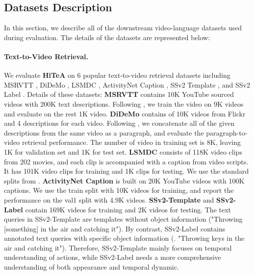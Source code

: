 \documentclass[10pt,twocolumn,letterpaper]{article}
\newcommand{\modelname}{\textbf{HiTeA}\xspace}
\begin{document}
\subsection{Datasets Description}
In this section, we describe all of the downstream video-language datasets used during evaluation. The details of the datasets are represented below:
\paragraph{Text-to-Video Retrieval.}
We evaluate \modelname on 6 popular text-to-video retrieval datasets including MSRVTT \cite{xu2016msrvtt}, DiDeMo \cite{anne2017didemo}, LSMDC \cite{rohrbach2015lsmdc}, ActivityNet Caption \cite{krishna2017activitynetret}, SSv2 Template \cite{lei2022singularity}, and SSv2 Label \cite{lei2022singularity}. Details of these datasets:
\textbf{MSRVTT} \cite{xu2016msrvtt} contains 10K YouTube sourced videos with 200K text descriptions. Following \cite{li2022lavender, luo2022clip4clip, huang2022clover}, we train the video on 9K videos and evaluate on the rest 1K video. 
\textbf{DiDeMo} \cite{anne2017didemo} contains of 10K videos from Flickr and 4 descriptions for each video. Following \cite{li2022alpro, ma2022xclip, li2022lavender}, we concatenate all of the given descriptions from the same video as a paragraph, and evaluate the paragraph-to-video retrieval performance. The number of video in training set is 8K, leaving 1K for validation set and 1K for test set.
\textbf{LSMDC} \cite{rohrbach2015lsmdc} consists of 118K video clips from 202 movies, and each clip is accompanied with a caption from video scripts. It has 101K video clips for training and 1K clips for testing. We use the standard splits from \cite{rohrbach2015lsmdc}.
\textbf{ActivityNet Caption} \cite{krishna2017activitynetret} is built on 20K YouTube videos with 100K captions. We use the train split with 10K videos for training, and report the performance on the val1 split with 4.9K videos. 
\textbf{SSv2-Template} and \textbf{SSv2-Label} \cite{lei2022singularity} contain 169K videos for training and 2K videos for testing. The text queries in SSv2-Template are templates without object information (\eg "Throwing [something] in the air and catching it"). By contrast, SSv2-Label contains annotated text queries with specific object information (\eg. "Throwing keys in the air and catching it"). Therefore, SSv2-Template mainly focuses on temporal understanding of actions, while SSv2-Label needs a more comprehensive understanding of both appearance and temporal dynamic.
\end{document}
